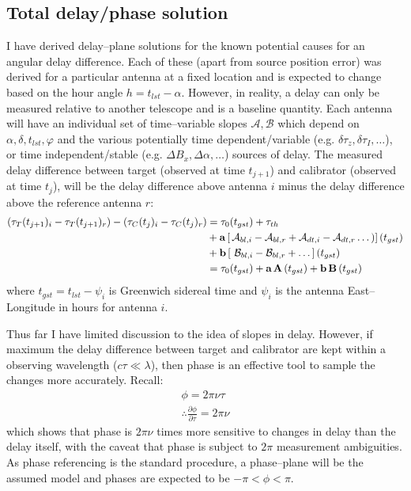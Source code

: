 	\subsection{Total delay/phase solution}
		I have derived delay--plane solutions for the known potential causes for an angular delay difference. Each of these (apart from source position error) was derived for a particular antenna at a fixed location and is expected to change based on the hour angle $h = t_{lst} - \alpha$. However, in reality, a delay can only be measured relative to another telescope and is a baseline quantity. Each antenna will have an individual set of time--variable slopes $\mathcal{A},\mathcal{B}$ which depend on $\alpha,\delta,t_{lst},\varphi$ and the various potentially time dependent/variable (e.g. $\delta\tau_z,\delta\tau_I,\dots$), or time independent/stable (e.g. $\Delta B_x, \Delta\alpha,\dots$) sources of delay. The measured delay difference between target (observed at time $t_{j+1}$) and calibrator (observed at time $t_{j}$), will be the delay difference above antenna $i$ minus the delay difference above the reference antenna $r$:
		\begin{equation}
			\begin{split}
				\left(\tau_T(t_{j+1})_i-\tau_T(t_{j+1})_r\right)-\left(\tau_C(t_{j})_i-\tau_C(t_{j})_r\right) &=\tau_0(t_{gst}) +\tau_{th}\\
				&+ {\bf a} \left[\,\mathcal{A}_{bl,i}-\mathcal{A}_{bl,r} + \mathcal{A}_{dt,i}-\mathcal{A}_{dt,r}\dots) \right](t_{gst}) \\
				&+ {\bf b}\left[\,\,\mathcal{B}_{bl,i}-\mathcal{B}_{bl,r} + \dots\right](t_{gst}) \\
				& = \tau_0(t_{gst}) + \textbf{a}\,\textbf{A}\left(t_{gst}\right)+\textbf{b}\,\textbf{B}\left(t_{gst}\right)
			\end{split}
		\end{equation} where $t_{gst}=t_{lst}-\psi_i$ is Greenwich sidereal time and $\psi_i$ is the antenna East--Longitude in hours for antenna $i$.
		
		Thus far I have limited discussion to the idea of slopes in delay. However, if maximum the delay difference between target and calibrator are kept within a observing wavelength ($c\tau\ll\lambda$), then phase is an effective tool to sample the changes more accurately. Recall:
		\begin{equation}
			\begin{split}
				\phi = 2\pi\nu\tau \\
				\therefore \frac{\partial\phi}{\partial\tau} = 2\pi\nu
			\end{split}
		\end{equation} which shows that phase is $2\pi\nu$ times more sensitive to changes in delay than the delay itself, with the caveat that phase is subject to $2\pi$ measurement ambiguities. As phase referencing is the standard procedure, a phase--plane will be the assumed model and phases are expected to be $-\pi<\phi<\pi$.

